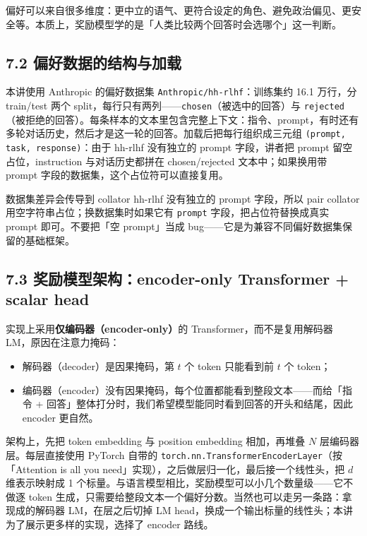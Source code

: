 偏好可以来自很多维度：更中立的语气、更符合设定的角色、避免政治偏见、更安全等。本质上，奖励模型学的是「人类比较两个回答时会选哪个」这一判断。

\subsection{7.2 偏好数据的结构与加载}

本讲使用 Anthropic 的偏好数据集 \texttt{Anthropic/hh-rlhf}：训练集约 16.1 万行，分 train/test 两个 split，每行只有两列——\texttt{chosen}（被选中的回答）与 \texttt{rejected}（被拒绝的回答）。每条样本的文本里包含完整上下文：指令、prompt，有时还有多轮对话历史，然后才是这一轮的回答。加载后把每行组织成三元组 \texttt{(prompt, task, response)}：由于 hh-rlhf 没有独立的 prompt 字段，讲者把 prompt 留空占位，instruction 与对话历史都拼在 chosen/rejected 文本中；如果换用带 prompt 字段的数据集，这个占位符可以直接复用。

\begin{warningbox}{数据集差异会传导到 collator}
hh-rlhf 没有独立的 prompt 字段，所以 pair collator 用空字符串占位；换数据集时如果它有 \texttt{prompt} 字段，把占位符替换成真实 prompt 即可。不要把「空 prompt」当成 bug——它是为兼容不同偏好数据集保留的基础框架。
\end{warningbox}

\subsection{7.3 奖励模型架构：encoder-only Transformer + scalar head}

实现上采用\textbf{仅编码器（encoder-only）}的 Transformer，而不是复用解码器 LM，原因在注意力掩码：

\begin{itemize}
\item 解码器（decoder）是因果掩码，第 $t$ 个 token 只能看到前 $t$ 个 token；
\item 编码器（encoder）没有因果掩码，每个位置都能看到整段文本——而给「指令 + 回答」整体打分时，我们希望模型能同时看到回答的开头和结尾，因此 encoder 更自然。
\end{itemize}

架构上，先把 token embedding 与 position embedding 相加，再堆叠 $N$ 层编码器层。每层直接使用 PyTorch 自带的 \texttt{torch.nn.TransformerEncoderLayer}（按「Attention is all you need」实现），之后做层归一化，最后接一个线性头，把 $d$ 维表示映射成 1 个标量。与语言模型相比，奖励模型可以小几个数量级——它不做逐 token 生成，只需要给整段文本一个偏好分数。当然也可以走另一条路：拿现成的解码器 LM，在层之后切掉 LM head，换成一个输出标量的线性头；本讲为了展示更多样的实现，选择了 encoder 路线。

